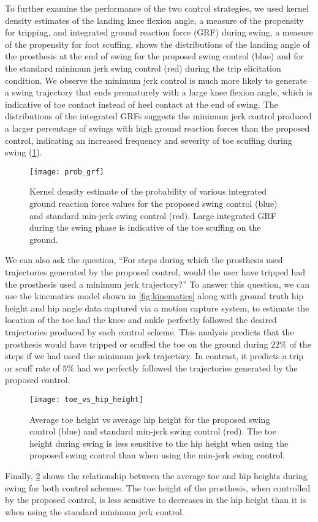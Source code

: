 To further examine the performance of the two control strategies, we used kernel
density estimates of the landing knee flexion angle, a measure of the propensity
for tripping, and integrated ground reaction force (GRF) during swing, a measure
of the propensity for foot scuffing.  shows the
distributions of the landing angle of the prosthesis at the end of swing for the
proposed swing control (blue) and for the standard minimum jerk swing control
(red) during the trip elicitation condition. We observe the minimum jerk control
is much more likely to generate a swing trajectory that ends prematurely with a
large knee flexion angle, which is indicative of toe contact instead of heel
contact at the end of swing.  The distributions of the integrated GRFs suggests
the minimum jerk control produced a larger percentage of swings with high ground
reaction forces than the proposed control, indicating an increased frequency and
severity of toe scuffing during swing (\cref{fig:p_grf}). 
\begin{figure}[t]
    \centering
    \texttt{[image: prob\_grf]}
    \caption[Kernel density estimate of the probability of integrated ground
    reaction force]{Kernel density estimate of the probability of various
    integrated ground reaction force values for the proposed swing control
    (blue) and standard min-jerk swing control (red). Large integrated GRF
    during the swing phase is indicative of the toe scuffing on the
    ground.}\label{fig:p_grf}
\end{figure}

We can also ask the question, ``For steps during which the prosthesis used
trajectories generated by the proposed control, would the user have tripped had
the prosthesis used a minimum jerk trajectory?'' To answer this question, we can
use the kinematics model shown in \cref{fig:kinematics} along with ground truth
hip height and hip angle data captured via a motion capture system, to estimate
the location of the toe had the knee and ankle perfectly followed the desired
trajectories produced by each control scheme. This analysis predicts that the
prosthesis would have tripped or scuffed the toe on the ground during $22\%$ of
the steps if we had used the minimum jerk trajectory. In contrast, it predicts a
trip or scuff rate of $5\%$ had we perfectly followed the trajectories generated
by the proposed control.

\begin{figure}[t]
    \centering
    \texttt{[image: toe\_vs\_hip\_height]}
    \caption[Average toe height vs average hip height]{Average toe height vs
    average hip height for the proposed swing control (blue) and standard
    min-jerk swing control (red). The toe height during swing is less sensitive
    to the hip height when using the proposed swing control than when using the
    min-jerk swing control.}\label{fig:toe_vs_hip}
\end{figure}

Finally, \cref{fig:toe_vs_hip} shows the relationship between the average toe
and hip heights during swing for both control schemes. The toe height of the
prosthesis, when controlled by the proposed control, is less sensitive to
decreases in the hip height than it is when using the standard minimum jerk
control.
